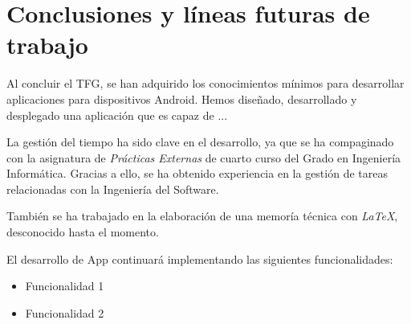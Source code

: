 %
%
%
%
\chapter{Conclusiones y líneas futuras de trabajo} \label{chap:to-do} 

Al concluir el TFG, se han adquirido los conocimientos mínimos para desarrollar aplicaciones para dispositivos Android. 
Hemos diseñado, desarrollado y desplegado una aplicación que es capaz de ...

La gestión del tiempo ha sido clave en el desarrollo, ya que se ha compaginado con la asignatura de \textit{Prácticas Externas} de cuarto curso del 
Grado en Ingeniería Informática. Gracias a ello, se ha obtenido experiencia en la gestión de tareas relacionadas con la Ingeniería del 
Software. 

También se ha trabajado en la elaboración de una memoría técnica con \textit{LaTeX}, desconocido hasta el momento. 

El desarrollo de App continuará implementando las siguientes funcionalidades:

\begin{itemize}

\item Funcionalidad 1

\item Funcionalidad 2

\end{itemize}


